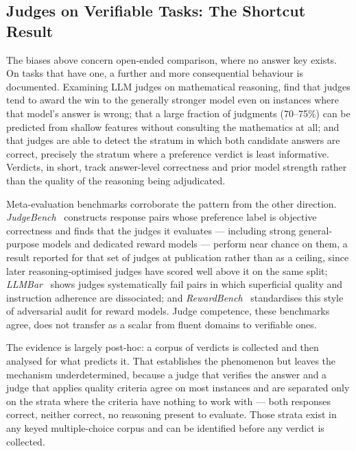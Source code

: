 \subsection*{Judges on Verifiable Tasks: The Shortcut Result}

The biases above concern open-ended comparison, where no answer key
exists. On tasks that have one, a further and more consequential
behaviour is documented. Examining LLM judges on mathematical
reasoning, \textcite{stephan2024calculation} find that judges tend to
award the win to the generally stronger model even on instances where
that model's answer is wrong; that a large fraction of judgments
(70--75\%) can be predicted from shallow features without consulting
the mathematics at all; and that judges are able to detect the
stratum in which both candidate answers are correct, precisely the
stratum where a preference verdict is least informative. Verdicts, in
short, track answer-level correctness and prior model strength rather
than the quality of the reasoning being adjudicated.

Meta-evaluation benchmarks corroborate the pattern from the other
direction. \textit{JudgeBench}~\parencite{tan2025judgebench}
constructs response pairs whose preference label is objective
correctness and finds that the judges it evaluates --- including
strong general-purpose models and dedicated reward models --- perform
near chance on them, a result reported for that set of judges at
publication rather than as a ceiling, since later
reasoning-optimised judges have scored well above it on the
same split; \textit{LLMBar}~\parencite{zeng2024llmbar} shows
judges systematically fail pairs in which superficial quality and
instruction adherence are dissociated; and
\textit{RewardBench}~\parencite{lambert2024rewardbench} standardises
this style of adversarial audit for reward models. Judge competence,
these benchmarks agree, does not transfer as a scalar from fluent
domains to verifiable ones.

The evidence is largely post-hoc: a corpus of verdicts is collected
and then analysed for what predicts it. That establishes the
phenomenon but leaves the mechanism underdetermined, because a judge
that verifies the answer and a judge that applies quality criteria
agree on most instances and are separated only on the strata where
the criteria have nothing to work with --- both responses correct,
neither correct, no reasoning present to evaluate. Those strata exist
in any keyed multiple-choice corpus and can be identified before any
verdict is collected.

